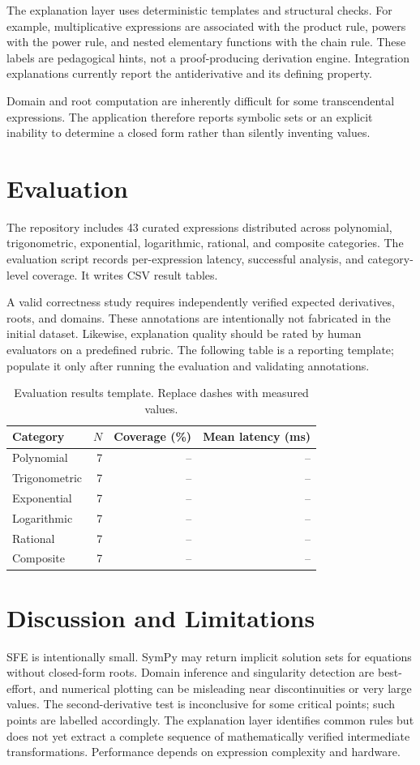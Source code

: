 \documentclass[11pt]{article}
\begin{document}
The explanation layer uses deterministic templates and structural checks. For example, multiplicative expressions are associated with the product rule, powers with the power rule, and nested elementary functions with the chain rule. These labels are pedagogical hints, not a proof-producing derivation engine. Integration explanations currently report the antiderivative and its defining property.

Domain and root computation are inherently difficult for some transcendental expressions. The application therefore reports symbolic sets or an explicit inability to determine a closed form rather than silently inventing values.

\section{Evaluation}
The repository includes 43 curated expressions distributed across polynomial, trigonometric, exponential, logarithmic, rational, and composite categories. The evaluation script records per-expression latency, successful analysis, and category-level coverage. It writes CSV result tables.

A valid correctness study requires independently verified expected derivatives, roots, and domains. These annotations are intentionally not fabricated in the initial dataset. Likewise, explanation quality should be rated by human evaluators on a predefined rubric. The following table is a reporting template; populate it only after running the evaluation and validating annotations.

\begin{table}[h]
\centering
\begin{tabular}{lrrr}
\toprule
Category & \(N\) & Coverage (\%) & Mean latency (ms)\\
\midrule
Polynomial & 7 & -- & --\\
Trigonometric & 7 & -- & --\\
Exponential & 7 & -- & --\\
Logarithmic & 7 & -- & --\\
Rational & 7 & -- & --\\
Composite & 7 & -- & --\\
\bottomrule
\end{tabular}
\caption{Evaluation results template. Replace dashes with measured values.}
\end{table}

\section{Discussion and Limitations}
SFE is intentionally small. SymPy may return implicit solution sets for equations without closed-form roots. Domain inference and singularity detection are best-effort, and numerical plotting can be misleading near discontinuities or very large values. The second-derivative test is inconclusive for some critical points; such points are labelled accordingly. The explanation layer identifies common rules but does not yet extract a complete sequence of mathematically verified intermediate transformations. Performance depends on expression complexity and hardware.
\end{document}
